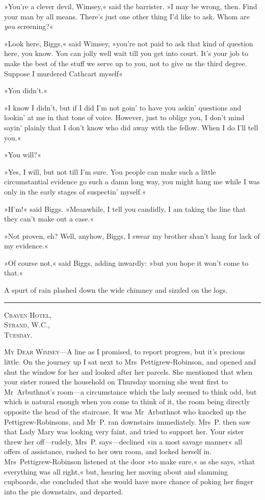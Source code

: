 »You're a clever devil, Wimsey,« said the barrister. »I may be wrong, then. Find your man by all means. There's just one other thing I'd like to ask. Whom are \textit{you} screening?«

»Look here, Biggs,« said Wimsey, »you're not paid to ask that kind of question here, you know. You can jolly well wait till you get into court. It's your job to make the best of the stuff we serve up to you, not to give us the third degree. Suppose I murdered Cathcart myself\longdash«

»You didn't.«

»I know I didn't, but if I did I'm not goin' to have you askin' questions and lookin' at me in that tone of voice. However, just to oblige you, I don't mind sayin' plainly that I don't know who did away with the fellow. When I do I'll tell you.«

»You will?«

»Yes, I will, but not till I'm sure. You people can make such a little circumstantial evidence go such a damn long way, you might hang me while I was only in the early stages of suspectin' myself.«

»H'm!« said Biggs. »Meanwhile, I tell you candidly, I am taking the line that they can't make out a case.«

»Not proven, eh? Well, anyhow, Biggs, I swear my brother shan't hang for lack of my evidence.«

»Of course not,« said Biggs, adding inwardly: »but you hope it won't come to that.«

A spurt of rain plashed down the wide chimney and sizzled on the logs.

\noindent\hfil\rule{0.5\textwidth}{.4pt}\hfil

\begin{flushright}
\textsc{Craven Hotel,}\\
\textsc{Strand, W.C.,}\\
\textsc{Tuesday.}
\end{flushright}


\textsc{My Dear Wimsey}—A line as I promised, to report progress, but it's precious little. On the journey up I sat next to Mrs~Pettigrew-Robinson, and opened and shut the window for her and looked after her parcels. She mentioned that when your sister roused the household on Thursday morning she went first to Mr~Arbuthnot's room—a circumstance which the lady seemed to think odd, but which is natural enough when you come to think of it, the room being directly opposite the head of the staircase. It was Mr~Arbuthnot who knocked up the Pettigrew-Robinsons, and Mr~P. ran downstairs immediately.  Mrs~P. then saw that Lady Mary was looking very faint, and tried to support her. Your sister threw her off—rudely, Mrs~P. says—declined »in a most savage manner« all offers of assistance, rushed to her own room, and locked herself in. Mrs~Pettigrew-Robinson listened at the door »to make sure,« as she says, »that everything was all right,« but, hearing her moving about and slamming cupboards, she concluded that she would have more chance of poking her finger into the pie downstairs, and departed.

